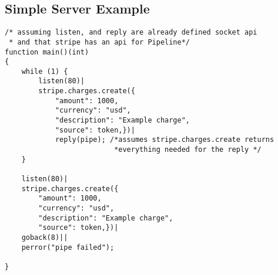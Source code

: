 \documentclass[11pt]{article}
\begin{document}
\subsection{Simple Server Example}
\begin{lstlisting}
/* assuming listen, and reply are already defined socket api
 * and that stripe has an api for Pipeline*/
function main()(int)
{
	while (1) {
		listen(80)|
		stripe.charges.create({
			"amount": 1000,
			"currency": "usd",
			"description": "Example charge",
			"source": token,})|
			reply(pipe); /*assumes stripe.charges.create returns
			              *everything needed for the reply */
	}
	
	listen(80)|
	stripe.charges.create({
		"amount": 1000,
		"currency": "usd",
		"description": "Example charge",
		"source": token,})|
	goback(8)||
	perror("pipe failed");
	
}	
\end{lstlisting}

\end{document}
